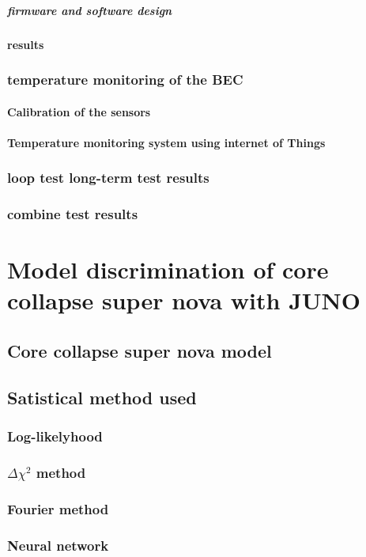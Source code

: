 \documentclass[a4paper,english,12pt]{memoir}
\begin{document}
\subsubsection{firmware and software design}
\subsection{results}
\section{temperature monitoring of the BEC}
\subsection{Calibration of the sensors}
\subsection{ Temperature monitoring system using internet of Things}
\section{loop test long-term test results}
\section{combine test results}



\part{Model discrimination of core collapse super nova with JUNO}
\chapter{Core collapse super nova model}
\chapter{Satistical method used}
\section{Log-likelyhood}
\section{$\Delta\chi^2$ method}
\section{Fourier method}
\section{Neural network}
\end{document}
